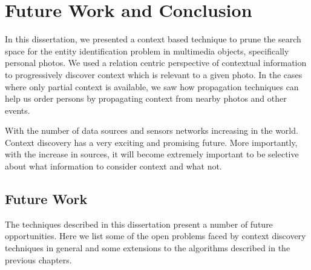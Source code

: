 \chapter{Future Work and Conclusion}

In this dissertation, we presented a context based technique to prune the search space for the entity identification problem in multimedia objects, specifically personal photos. We used a relation centric perspective of contextual information to progressively discover context which is relevant to a given photo. In the cases where only partial context is available, we saw how propagation techniques can help us order persons by propagating context from nearby photos and other events.

With the number of data sources and sensors networks increasing in the world. Context discovery has a very exciting and promising future. More importantly, with the increase in sources, it will become extremely important to be selective about what information to consider context and what not. 

\section{Future Work}
The techniques described in this dissertation present a number of future opportunities. Here we list some of the open problems faced by context discovery techniques in general and some extensions to the algorithms described in the previous chapters. 

